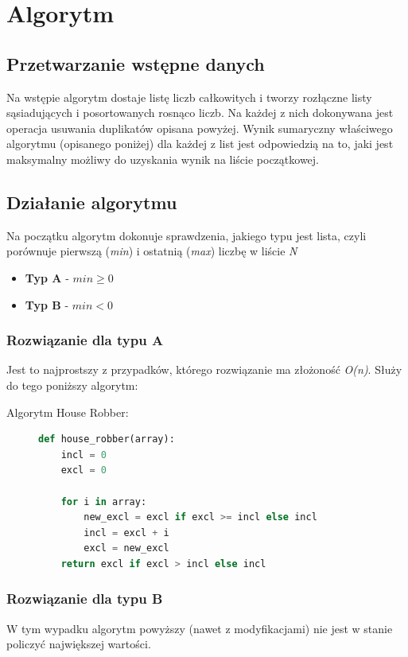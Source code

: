 \documentclass[11pt]{article} %
\begin{document}
\section{Algorytm}
\subsection{Przetwarzanie wstępne danych}
Na wstępie algorytm dostaje listę liczb całkowitych i tworzy rozłączne listy sąsiadujących i posortowanych rosnąco liczb. Na każdej z nich dokonywana jest operacja usuwania duplikatów opisana powyżej. Wynik sumaryczny właściwego algorytmu (opisanego poniżej) dla każdej z list jest odpowiedzią na to, jaki jest maksymalny możliwy do uzyskania wynik na liście początkowej.
\subsection{Działanie algorytmu}
Na początku algorytm dokonuje sprawdzenia, jakiego typu jest lista, czyli porównuje pierwszą (\textsl{min}) i ostatnią (\textsl{max}) liczbę w liście \textsl{N}
\begin{itemize}
  \item \textbf{Typ A} - \( min \geqslant 0\)
  \item \textbf{Typ B} - \( min < 0 \)	
\end{itemize}
\subsubsection{Rozwiązanie dla typu A}
Jest to najprostszy z przypadków, którego rozwiązanie ma złożoność \textsl{O(n)}. Służy do tego poniższy algorytm:
\begin{description}
\item[Algorytm House Robber:]\leavevmode
\begin{lstlisting}[language=Python]
def house_robber(array):
    incl = 0
    excl = 0

    for i in array:
        new_excl = excl if excl >= incl else incl
        incl = excl + i
        excl = new_excl
    return excl if excl > incl else incl
\end{lstlisting}
\end{description}
\subsubsection{Rozwiązanie dla typu B}
W tym wypadku algorytm powyższy (nawet z modyfikacjami) nie jest w stanie policzyć największej wartości.
\end{document}
